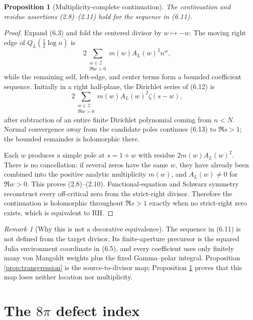 \documentclass[11pt]{article}
\newtheorem{proposition}[theorem]{Proposition}
\theoremstyle{definition}
\theoremstyle{remark}
\newtheorem{remark}[theorem]{Remark}
\newcommand{\cZ}{\mathcal Z}
\begin{document}
\begin{proposition}[Multiplicity-complete continuation]\label{prop:tomography}
The continuation and residue assertions \emph{(2.8)--(2.11)} hold for the sequence in
\emph{(6.11)}.
\end{proposition}

\begin{proof}
Expand (6.3) and fold the centered divisor by \(w\mapsto-w\).  The moving right edge of
\(Q_L(\frac12\log n)\) is
\[
 2\sum_{\substack{w\in\cZ\\ \Re w>0}}
 m(w)A_L(w)^2n^w,                                  \tag{6.12}
\]
while the remaining self, left-edge, and center terms form a bounded coefficient sequence.
Initially in a right half-plane, the Dirichlet series of (6.12) is
\[
 2\sum_{\substack{w\in\cZ\\ \Re w>0}}
 m(w)A_L(w)^2\zeta(s-w),                            \tag{6.13}
\]
after subtraction of an entire finite Dirichlet polynomial coming from \(n<N\).
Normal convergence away from the candidate poles continues (6.13) to \(\Re s>1\); the bounded
remainder is holomorphic there.

Each \(w\) produces a simple pole at \(s=1+w\) with residue \(2m(w)A_L(w)^2\).  There is no
cancellation: if several zeros have the same \(w\), they have already been combined into the
positive analytic multiplicity \(m(w)\), and \(A_L(w)\ne0\) for \(\Re w>0\).
This proves (2.8)--(2.10).  Functional-equation and Schwarz symmetry reconstruct every
off-critical zero from the strict-right divisor.  Therefore the continuation is holomorphic
throughout \(\Re s>1\) exactly when no strict-right zero exists, which is equivalent to RH.
\end{proof}

\begin{remark}[Why this is not a decorative equivalence]
The sequence in (6.11) is not defined from the target divisor.  Its finite-aperture precursor is
the squared Julia environment coordinate in (6.5), and every coefficient uses only finitely many
von Mangoldt weights plus the fixed Gamma--polar integral.  Proposition
\ref{prop:transgression} is the source-to-divisor map; Proposition \ref{prop:tomography} proves
that this map loses neither location nor multiplicity.
\end{remark}

\section{The \texorpdfstring{\(8\pi\)}{8pi} defect index}\label{sec:index}
\end{document}
